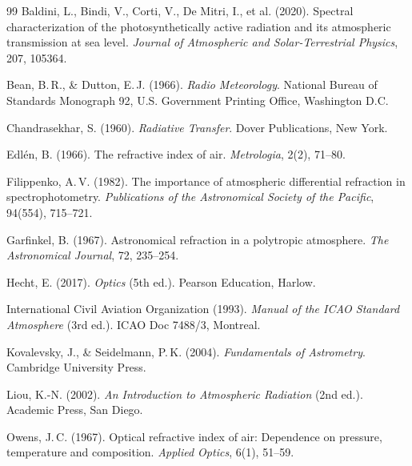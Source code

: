 \documentclass[12pt,a4paper]{article}
\begin{document}
\begin{thebibliography}{99}
Baldini, L., Bindi, V., Corti, V., De Mitri, I., et al. (2020).
\newblock Spectral characterization of the photosynthetically active radiation
  and its atmospheric transmission at sea level.
\newblock \textit{Journal of Atmospheric and Solar-Terrestrial Physics}, 207,
  105364.
\newblock {}

Bean, B.\,R., \& Dutton, E.\,J. (1966).
\newblock \textit{Radio Meteorology}.
\newblock National Bureau of Standards Monograph 92,
  U.S. Government Printing Office, Washington D.C.

Chandrasekhar, S. (1960).
\newblock \textit{Radiative Transfer}.
\newblock Dover Publications, New York.

Edlén, B. (1966).
\newblock The refractive index of air.
\newblock \textit{Metrologia}, 2(2), 71--80.
\newblock {}

Filippenko, A.\,V. (1982).
\newblock The importance of atmospheric differential refraction in
  spectrophotometry.
\newblock \textit{Publications of the Astronomical Society of the Pacific},
  94(554), 715--721.
\newblock {}

Garfinkel, B. (1967).
\newblock Astronomical refraction in a polytropic atmosphere.
\newblock \textit{The Astronomical Journal}, 72, 235--254.
\newblock {}

Hecht, E. (2017).
\newblock \textit{Optics} (5th ed.).
\newblock Pearson Education, Harlow.

International Civil Aviation Organization (1993).
\newblock \textit{Manual of the ICAO Standard Atmosphere} (3rd ed.).
\newblock ICAO Doc 7488/3, Montreal.

Kovalevsky, J., \& Seidelmann, P.\,K. (2004).
\newblock \textit{Fundamentals of Astrometry}.
\newblock Cambridge University Press.
\newblock {}

Liou, K.-N. (2002).
\newblock \textit{An Introduction to Atmospheric Radiation} (2nd ed.).
\newblock Academic Press, San Diego.

Owens, J.\,C. (1967).
\newblock Optical refractive index of air: Dependence on pressure, temperature
  and composition.
\newblock \textit{Applied Optics}, 6(1), 51--59.
\newblock {}


\end{thebibliography}
\end{document}

